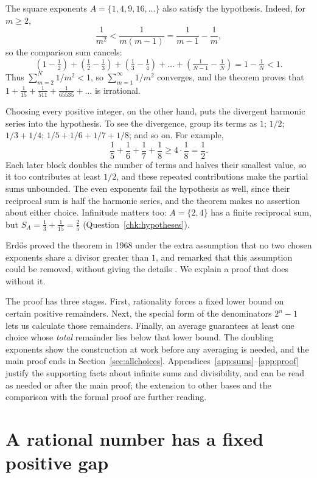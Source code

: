 \documentclass[10pt]{article}
\theoremstyle{plain}
\theoremstyle{definition}
\theoremstyle{remark}
\begin{document}
\begin{samepage}
The square exponents $A=\{1,4,9,16,\dots\}$ also satisfy the
hypothesis. Indeed, for $m\ge2$,
\[
 \frac1{m^2}<\frac1{m(m-1)}=\frac1{m-1}-\frac1m,
\]
so the comparison sum cancels:
\[
 (1-\tfrac12)+(\tfrac12-\tfrac13)+(\tfrac13-\tfrac14)
 +\dots+(\tfrac1{N-1}-\tfrac1N)=1-\tfrac1N<1.
\]
Thus $\sum_{m=2}^{N}1/m^2<1$, so $\sum_{m=1}^{\infty}1/m^2$ converges,
and the theorem proves that
$1+\tfrac1{15}+\tfrac1{511}+\tfrac1{65535}+\dots$ is irrational.\par
\end{samepage}

Choosing every positive integer, on the other hand, puts the divergent
harmonic series into the hypothesis. To see the divergence, group its
terms as $1$; $1/2$; $1/3+1/4$; $1/5+1/6+1/7+1/8$; and so on. For
example,
\[
 \frac15+\frac16+\frac17+\frac18\ge4\cdot\frac18=\frac12.
\]
Each later block doubles the number of terms and halves their smallest
value, so it too contributes at least $1/2$, and these repeated
contributions make the partial sums unbounded. The even exponents fail
the hypothesis as well, since their reciprocal sum is half the harmonic
series, and the theorem makes no assertion about either choice.
Infinitude matters too: $A=\{2,4\}$ has a finite reciprocal sum, but
$S_A=\tfrac13+\tfrac1{15}=\tfrac25$ (Question~\ref{chk:hypotheses}).

Erd\H{o}s proved the theorem in 1968 under the extra assumption that no
two chosen exponents share a divisor greater than $1$, and remarked that
this assumption could be removed, without giving the details
\cite[p.~222]{erdos1968}. We explain a proof that does without it.

The proof has three stages. First, rationality forces a fixed lower
bound on certain positive remainders. Next, the special form of the
denominators $2^n-1$ lets us calculate those remainders. Finally, an
average guarantees at least one choice whose \emph{total} remainder lies
below that lower bound. The doubling exponents show the construction at
work before any averaging is needed, and the main proof ends in
Section~\ref{sec:allchoices}. Appendices~\ref{app:sums}--\ref{app:proof}
justify the supporting facts about infinite sums and divisibility, and
can be read as needed or after the main proof; the extension to other
bases and the comparison with the formal proof are further reading.

\section{A rational number has a fixed positive gap}\label{sec:test}
\end{document}
